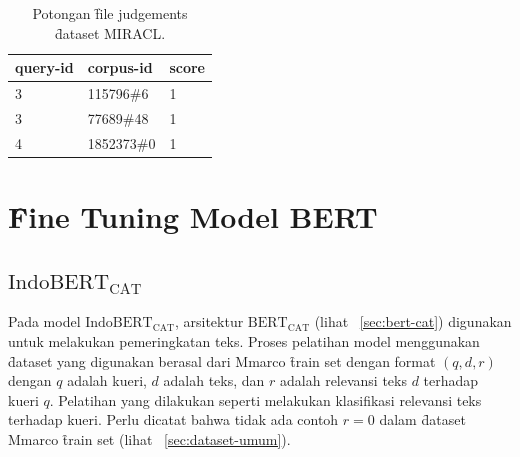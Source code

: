 \begin{table}
    \centering
    \caption{Potongan \f{file} judgements \f{dataset} MIRACL.}
    \label{tab:judgements-file-example-bab4}
    \begin{tabular}{|l|l|l|}
        \hline
        \textbf{query-id} & \textbf{corpus-id} & \textbf{score} \\ \hline
        3                 & 115796\#6          & 1              \\ \hline
        3                 & 77689\#48          & 1              \\ \hline
        4                 & 1852373\#0         & 1              \\ \hline
    \end{tabular}
\end{table}


\section{\f{Fine Tuning} Model BERT}
\label{sec:finetuning}


\subsection{$\text{IndoBERT}_{\text{CAT}}$}


Pada model $\text{IndoBERT}_{\text{CAT}}$, arsitektur $\text{BERT}_\text{CAT}$ (lihat \sect~\ref{sec:bert-cat}) digunakan untuk melakukan pemeringkatan teks. Proses pelatihan model menggunakan \f{dataset} yang digunakan berasal dari Mmarco \f{train set} dengan format $(q, d, r)$ dengan $q$ adalah kueri, $d$ adalah teks, dan $r$ adalah relevansi teks $d$ terhadap kueri $q$. Pelatihan yang dilakukan seperti melakukan klasifikasi relevansi teks terhadap kueri. Perlu dicatat bahwa tidak ada contoh $r=0$ dalam \f{dataset} Mmarco \f{train set} (lihat \sect~\ref{sec:dataset-umum}).

